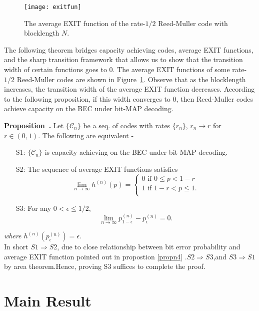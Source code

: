 \documentclass[
10pt, %
a4paper, %
oneside, %
headinclude,footinclude, %
BCOR5mm, %
]{scrartcl}
\newenvironment{proposition}[1][]{\refstepcounter{definition}\par\medskip
   \noindent \textbf{Proposition~\thedefinition. #1} \rmfamily}{\medskip}
\begin{document}
\begin{figure}[h]
\centering 
\texttt{[image: exitfun]} 
\caption[]{The average EXIT function of the rate-$1/2$ Reed-Muller code with blocklength $N$.} %
\label{fig:exit} 
\end{figure}

The following theorem bridges capacity achieving codes, average EXIT functions, and the sharp transition framework that allows us to show that the transition width of certain functions goes to $0$. The average EXIT functions of some rate-$1/2$ Reed-Muller codes are shown in Figure~\ref{fig:exit}. Observe that as the blocklength increases, the transition width of the average EXIT function decreases. According to the following proposition, if this width converges to $0$, then Reed-Muller codes achieve capacity on the BEC under bit-MAP decoding.
\begin{proposition}
Let $\{\mathcal{C}_n\}$ be a seq. of codes with rates $\{r_n\}$, $r_n \to r$ for $r \in (0,1)$. The following are equivalent -
\begin{enumerate}
\item[S1:] $\{\mathcal{C}_n\}$ is capacity achieving on the BEC under bit-MAP decoding.
\item[S2:] The sequence of average EXIT functions satisfies
\[
    \lim_{n \to \infty} h^{(n)}(p)=\left\{
                \begin{array}{ll}
                  0 \text{ if } 0 \le p < 1-r\\
                  1 \text{ if } 1-r < p \le 1.\\
                \end{array}
              \right.
  \]
\item[S3:] For any $0 < \epsilon \le 1/2$, $$\lim_{n \to \infty} p_{1-\epsilon}^{(n)} - p_{\epsilon}^{(n)} = 0.$$
\end{enumerate}
\label{propn11}
\end{proposition}
\emph{where $h^{(n)}(p_{\epsilon}^{(n)})=\epsilon$.}\\
In short $S1\Rightarrow S2$, due to close relationship between bit error probability and average EXIT function pointed out in propostion \ref{propn4} .$S2\Rightarrow S3$,and $S3\Rightarrow S1$ by area theorem.Hence, proving S3 suffices to complete the proof.

\section{Main Result}
\end{document}
